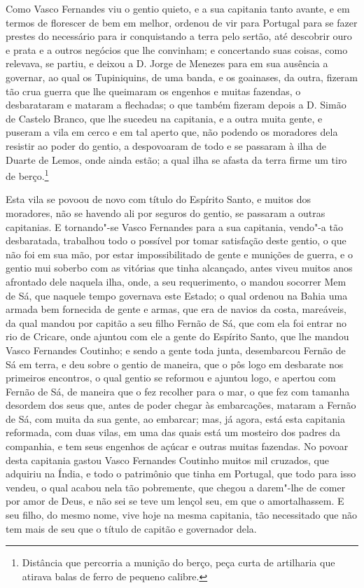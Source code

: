 \begin{linenumbers}
Como Vasco Fernandes viu o gentio quieto, e a sua capitania tanto avante, e em termos de
florescer de bem em melhor, ordenou de vir para Portugal para se fazer prestes do
necessário para ir conquistando a terra pelo sertão, até descobrir ouro e prata e a outros
negócios que lhe convinham; e concertando suas coisas, como relevava, se partiu, e deixou
a D. Jorge de Menezes para em sua ausência a governar, ao qual os Tupiniquins, de uma
banda, e os goainases, da outra, fizeram tão crua guerra que lhe queimaram os engenhos e
muitas fazendas, o desbarataram e mataram a flechadas; o que também fizeram depois a D.
Simão de Castelo Branco, que lhe sucedeu na capitania, e a outra muita gente, e puseram a
vila em cerco e em tal aperto que, não podendo os moradores dela resistir ao poder do
gentio, a despovoaram de todo e se passaram à ilha de Duarte de Lemos, onde ainda estão; a
qual ilha se afasta da terra firme um tiro de berço.\footnote{ Distância que percorria a munição do berço, peça curta de artilharia que atirava balas de ferro de pequeno calibre.}

Esta vila se povoou de novo com título do Espírito Santo, e muitos dos moradores, não se
havendo ali por seguros do gentio, se passaram a outras capitanias. E tornando"-se Vasco
Fernandes para a sua capitania, vendo"-a tão desbaratada, trabalhou todo o possível por
tomar satisfação deste gentio, o que não foi em sua mão, por estar impossibilitado de
gente e munições de guerra, e o gentio mui soberbo com as vitórias que tinha alcançado,
antes viveu muitos anos afrontado dele naquela ilha, onde, a seu requerimento, o mandou
socorrer Mem de Sá, que naquele tempo governava este Estado; o qual ordenou na Bahia uma
armada bem fornecida de gente e armas, que era de navios da costa, mareáveis, da qual
mandou por capitão a seu filho Fernão de Sá, que com ela foi entrar no rio de Cricare,
onde ajuntou com ele a gente do Espírito Santo, que lhe mandou Vasco Fernandes Coutinho; e
sendo a gente toda junta, desembarcou Fernão de Sá em terra, e deu sobre o gentio de
maneira, que o pôs logo em desbarate nos primeiros encontros, o qual gentio se reformou e
ajuntou logo, e apertou com Fernão de Sá, de maneira que o fez recolher para o mar, o que
fez com tamanha desordem dos seus que, antes de poder chegar às embarcações, mataram a
Fernão de Sá, com muita da sua gente, ao embarcar; mas, já agora, está esta capitania
reformada, com duas vilas, em uma das quais está um mosteiro dos padres da companhia, e
tem seus engenhos de açúcar e outras muitas fazendas. No povoar desta capitania gastou
Vasco Fernandes Coutinho muitos mil cruzados, que adquiriu na Índia, e todo o patrimônio
que tinha em Portugal, que todo para isso vendeu, o qual acabou nela tão pobremente, que
chegou a darem"-lhe de comer por amor de Deus, e não sei se teve um lençol seu, em que o
amortalhassem. E seu filho, do mesmo nome, vive hoje na mesma capitania, tão necessitado
que não tem mais de seu que o título de capitão e governador dela.


\end{linenumbers}
